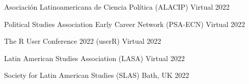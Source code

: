 






\vspace{1mm}

\begin{cvhonors}
\cvconf
{Asociación Latinoamericana de Ciencia Política (ALACIP)} 
{Virtual}
{2022}
\end{cvhonors}

\begin{cvhonors}
\cvconf
{Political Studies Association Early Career Network (PSA-ECN)} 
{Virtual}
{2022}
\end{cvhonors}

\begin{cvhonors}
\cvconf
{The R User Conference 2022 (userR)} 
{Virtual}
{2022}
\end{cvhonors}

\begin{cvhonors}
\cvconf
{Latin American Studies Association (LASA)} 
{Virtual}
{2022}
\end{cvhonors}

\begin{cvhonors}
\cvconf
{Society for Latin American Studies (SLAS)} 
{Bath, UK}
{2022}
\end{cvhonors}


